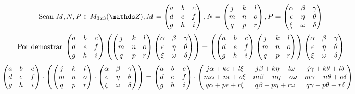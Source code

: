 \documentclass{article}
\begin{document}
\newcommand{\Mmat}{\begin{pmatrix}
		a & b & c\\
		d & e & f\\
		g & h & i
\end{pmatrix}}
 $$\text{Sean } M, N, P \in \mtt, M = \Mmat, N = \Nmat, P = \Pmat $$
 $$\text{Por demostrar } \Mmat \* \left( \Nmat \* \Pmat \right) = \left( \Mmat \* \Nmat  \right) \* \Pmat $$
\begin{align*}
\Mmat \* \left( \Nmat \* \Pmat \right) &=  \Mmat \* 
\begin{pmatrix}
j\alpha + k \epsilon + l\xi & j\beta + k\eta + l\omega & j\gamma +  k\theta + l\delta\\
m\alpha + n\epsilon + o\xi & m\beta + n\eta + o\omega & m\gamma +  n\theta + o\delta\\
q\alpha + p\epsilon + r\xi & q\beta + p\eta + r\omega & q\gamma +  p\theta + r\delta\\
\end{pmatrix}
\end{align*}
\end{document}
